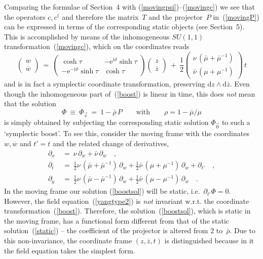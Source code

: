 \documentclass[a4paper,11pt]{article}
\numberwithin{equation}{section}
\def\e{\mbox{e}}
\def\i{\mbox{i}}
\def\pa{\mbox{$\partial$}}
\def\diff{\mbox{d}}
\def\sfrac#1#2{{\textstyle\frac{#1}{#2}}}
\newcommand{\cdag}{c^{\dagger}}
\newcommand{\zb}{\overline{z}}
\newcommand{\wb}{\overline{w}}
\begin{document}
Comparing the formulae of Section~4 with (\ref{movingpsi})--(\ref{movingc})
we see that the operators $c,\cdag$ and therefore the matrix~$T$ and
the projector~$P$ in~(\ref{movingP}) can be expressed in terms of the
corresponding static objects (see Section~5).
This is accomplished by means of the
inhomogeneous $SU(1,1)$ transformation~(\ref{movingc}),
which on the coordinates reads
\begin{equation} \label{boost}
\begin{pmatrix} w \\[4pt] \wb \end{pmatrix}\ =\
\begin{pmatrix} \cosh\tau & -\e^{\i\vartheta}\sinh\tau \\[4pt]
                -\e^{-\i\vartheta}\sinh\tau & \cosh\tau \end{pmatrix}
\begin{pmatrix} z \\[4pt] \zb \end{pmatrix}\ +\ \frac12
\begin{pmatrix} \nu\,(\bar\mu+\bar\mu^{-1}) \\[4pt]
                \bar\nu\,(\mu+\mu^{-1}) \end{pmatrix} \,t
\end{equation}
and is in fact a symplectic coordinate transformation,
preserving $\diff{z}\wedge\diff{\zb}$.
Even though the inhomogeneous part of~(\ref{boost}) is linear in time,
this does {\it not\/} mean that the solution
\begin{equation} \label{boostsol}
\Phi\ \equiv\ \Phi_{\vec v}\ =\ 1 - \bar\rho\,P
\qquad\textrm{with}\qquad \rho=1-\bar\mu/\mu
\end{equation}
is simply obtained by subjecting the corresponding static solution
$\Phi_{\vec 0}$ to such a `symplectic boost'.
To see this, consider the moving frame with the coordinates
$w,\wb$ and $t'{=}t$ and the related change of derivatives,
\begin{align}
\pa_x\ &=\ \nu\,\pa_w + \bar\nu\,\pa_{\wb} \quad, \nonumber \\[4pt]
\pa_t\ &=\ \sfrac12\nu\,(\bar{\mu}+\bar{\mu}^{-1})\,\pa_w +
           \sfrac12\bar\nu\,(\mu+\mu^{-1})\,\pa_{\wb} +
		   \pa_{t'} \quad, \nonumber \\[4pt]
\pa_y\ &=\ \sfrac12\nu\,(\bar{\mu}-\bar{\mu}^{-1})\,\pa_w +
           \sfrac12\bar\nu\,(\mu-\mu^{-1})\,\pa_{\wb} \quad. \label{ders}
\end{align}
In the moving frame our solution (\ref{boostsol}) will be static,
i.e.~$\pa_{t'}\Phi=0$. However, the field equation~(\ref{yangtype2})
is {\it not\/} invariant w.r.t. the coordinate transformation~(\ref{boost}).
Therefore, the solution~(\ref{boostsol}), which is static in the moving frame,
has a functional form different from that of the static solution~(\ref{static})
-- the coefficient of the projector is altered from $2$ to~$\bar\rho$.
Due to this non-invariance, the coordinate frame $(z,\zb,t)$ is distinguished
because in it the field equation takes the simplest form.
\end{document}
